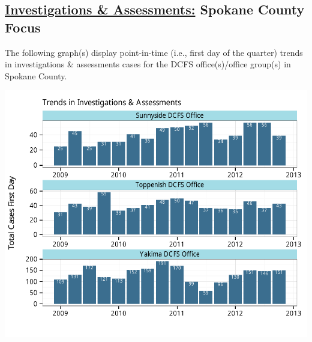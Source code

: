 \documentclass{article}\usepackage[]{graphicx}\usepackage[]{color}
\makeatletter
\def\maxwidth{ %
  \ifdim\Gin@nat@width>\linewidth
    \linewidth
  \else
    \Gin@nat@width
  \fi
}
\newenvironment{knitrout}{}{} %
\makeatother
\begin{document}
\begin{minipage}{\textwidth}
\subsection{\href{http://www.partnersforourchildren.org//child-well-being/visualizations/investigations-assessments/trends}
{Investigations \& Assessments:} Spokane County Focus}
The following graph(s) display point-in-time (i.e., first day of the quarter) trends in investigations \& assessments cases for the DCFS office(s)/office group(s) in Spokane County.  
\begin{knitrout}
\color{fgcolor}

{\centering \includegraphics[width=\maxwidth]{figure/ia_focus} 

}



\end{knitrout}

\end{minipage}

\newpage
\end{document}
